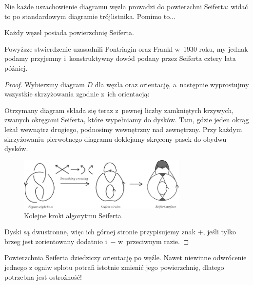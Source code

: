 Nie każde uszachowienie diagramu węzła prowadzi do powierzchni Seiferta:
widać to po standardowym diagramie trójlistnika.
Pomimo to...

\begin{proposition}
    \label{prp:seifert_exists}
    Każdy węzeł posiada powierzchnię Seiferta.
\end{proposition}

Powyższe stwierdzenie uzasadnili Pontriagin oraz Frankl w~1930 roku, my jednak podamy przyjemny i~konstruktywny dowód podany przez Seiferta \cite{seifert35} cztery lata później.
%

\begin{proof}
    Wybierzmy diagram $D$ dla węzła oraz orientację,
    a~następnie wyprostujmy wszystkie skrzyżowania zgodnie z~ich orientacją:

    Otrzymany diagram składa się teraz z~pewnej liczby zamkniętych krzywych,
    zwanych okręgami Seiferta, które wypełniamy do dysków.
    Tam, gdzie jeden okrąg leżał wewnątrz drugiego, podnosimy wewnętrzny nad zewnętrzny.
    Przy każdym skrzyżowaniu pierwotnego diagramu doklejamy skręcony pasek do obydwu dysków.

    \begin{figure}[H]
        \centering
        \includegraphics[width=0.75\textwidth]{../data/seifert-algorithm.jpg}
        \caption[Smthing]{Kolejne kroki algorytmu Seiferta}
    \end{figure}

    Dyski są dwustronne, więc ich górnej stronie przypisujemy znak $+$,
    jeśli tylko brzeg jest zorientowany dodatnio i~$-$ w~przeciwnym razie.
\end{proof}

Powierzchnia Seiferta dziedziczy orientację po węźle.
Nawet niewinne odwrócenie jednego z ogniw splotu potrafi istotnie zmienić jego powierzchnię, dlatego potrzebna jest ostrożność!

%


